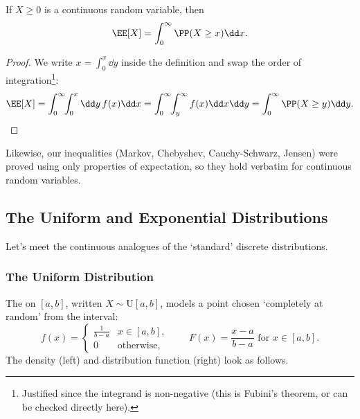 \begin{proposition}
	If $X \geq 0$ is a continuous random variable, then
	$$
	\EE[X] = \int_0^{\infty} \PP(X \geq x) \dd x.
	$$
\end{proposition}
\begin{proof}
	We write $x = \int_0^x \dd y$ inside the definition and swap the order of integration\footnote{Justified since the integrand is non-negative (this is Fubini's theorem, or can be checked directly here).}:
	$$
	\EE[X] = \int_0^{\infty}\!\! \int_0^x \dd y \, f(x)\dd x = \int_0^{\infty}\!\! \int_y^{\infty} f(x)\dd x \dd y = \int_0^{\infty} \PP(X \geq y)\dd y. \qedhere
	$$
\end{proof}

Likewise, our inequalities (Markov, Chebyshev, Cauchy-Schwarz, Jensen) were proved using only properties of expectation, so they hold verbatim for continuous random variables.

\subsection{The Uniform and Exponential Distributions}

Let's meet the continuous analogues of the `standard' discrete distributions.

\subsubsection*{The Uniform Distribution}

The  on $[a, b]$, written $X \sim \mathrm{U}[a, b]$, models a point chosen `completely at random' from the interval:
$$
f(x) = \begin{cases}
	\frac{1}{b - a} & x \in [a, b],\\
	0 & \text{otherwise},
\end{cases}
\qquad
F(x) = \frac{x - a}{b - a} \text{ for } x \in [a, b].
$$
The density (left) and distribution function (right) look as follows.

\begin{center}
\qquad
{}
\end{center}

